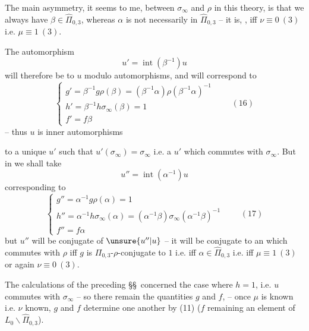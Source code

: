 The main asymmetry, it seems to me, between $\sigma_\infty$ and $\rho$ in this theory, is that  we always have $\beta\in\widehat{\Pi}_{0,3}$, whereas $\alpha$ is not necessarily in $\widehat{\Pi}_{0,3}$ -- it is, , iff $\nu\equiv0\ (3)$ i.e. $\mu\equiv1\ (3)$.

The automorphism
\[
u'=\operatorname{int}(\beta^{-1})u
\]
will therefore be  to $u$ modulo  automorphisms, and will correspond to
\[
\left\{\begin{array}{l}
g'=\beta^{-1}g\rho(\beta)=(\beta^{-1}\alpha)\rho(\beta^{-1}\alpha)^{-1}\\
h'=\beta^{-1}h\sigma_\infty(\beta)=1\\
f'=f\beta
\end{array}\right.
\qquad (16)
\]
-- thus $u$ is   inner automorphisms



to a unique $u'$ such that $u'(\sigma_\infty)=\sigma_\infty$ i.e. a $u'$ which commutes with $\sigma_\infty$. But in  we shall take
\[
u''=\operatorname{int}(\alpha^{-1})u
\]
corresponding to
\[
\left\{\begin{array}{l}
g''=\alpha^{-1}g\rho(\alpha)=1\\
h''=\alpha^{-1}h\sigma_\infty(\alpha)=(\alpha^{-1}\beta)\sigma_\infty(\alpha^{-1}\beta)^{-1}\\
f''=f\alpha
\end{array}\right.
\qquad (17)
\]
but $u''$ will be conjugate  of $\unsure{u''|u}$ -- it will be conjugate to an   which commutes with $\rho$ iff $g$ is $\Pi_{0,3}$-$\rho$-conjugate to $1$ i.e. iff $\alpha\in\widehat{\Pi}_{0,3}$ i.e. iff $\mu\equiv1\ (3)$ or again $\nu\equiv0\ (3)$.

 The calculations of the preceding \S\S\ concerned the case where $h=1$, i.e. $u$ commutes with $\sigma_\infty$ -- so  there remain the quantities $g$ and $f$,  
-- once $\mu$ is known i.e. $\nu$ known, $g$ and $f$ determine one another by (11) ($f$ remaining an element of $L_0\backslash\widehat{\Pi}_{0,3}$).

